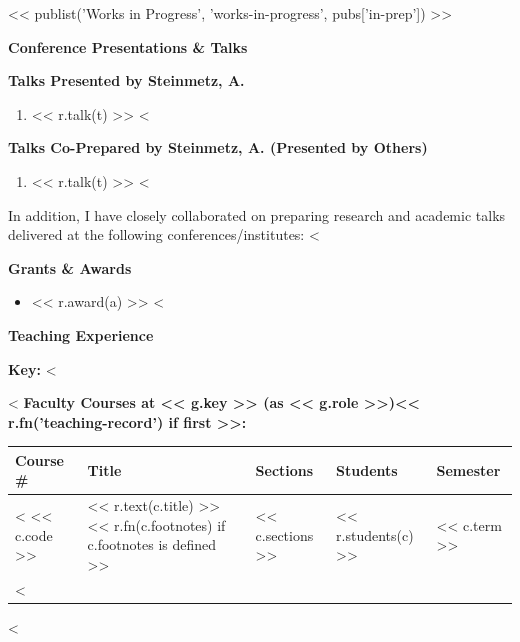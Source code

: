 \documentclass[11pt]{article}
\begin{document}
<< publist('Works in Progress', 'works-in-progress', pubs['in-prep']) >>
\medskip

{\Large\textbf{Conference Presentations \& Talks}}

{\large\textbf{Talks Presented by Steinmetz, A.}}

\begin{enumerate}[leftmargin=*,nosep]
<%
    \item << r.talk(t) >>
<%
\end{enumerate}

{\large\textbf{Talks Co-Prepared by Steinmetz, A. (Presented by Others)}}

\begin{enumerate}[leftmargin=*,nosep]
<%
    \item << r.talk(t) >>
<%
\end{enumerate}

\noindent In addition, I have closely collaborated on preparing research and academic talks delivered at the following conferences/institutes: <%

\medskip

{\Large\textbf{Grants \& Awards}}

\begin{itemize}[leftmargin=*,nosep]
<%
    \item << r.award(a) >>
<%
\end{itemize}

\medskip

{\Large\textbf{Teaching Experience}}

\textbf{Key:} <%

<%
\textbf{Faculty Courses at << g.key >> (as << g.role >>)<< r.fn('teaching-record') if first >>:}\\
{\normalsize
\begin{tabular}{@{}p{2.5cm} p{6.0cm} p{2.0cm} p{2.0cm} p{3.0cm}@{}}
    \toprule
    \textbf{Course \#} & \textbf{Title} & \textbf{Sections} & \textbf{Students} & \textbf{Semester} \\
    \midrule
<%
    << c.code >> & << r.text(c.title) >><< r.fn(c.footnotes) if c.footnotes is defined >> & << c.sections >> & << r.students(c) >> & << c.term >> \\
<%
    \bottomrule
\end{tabular}
}
<%
\end{document}

